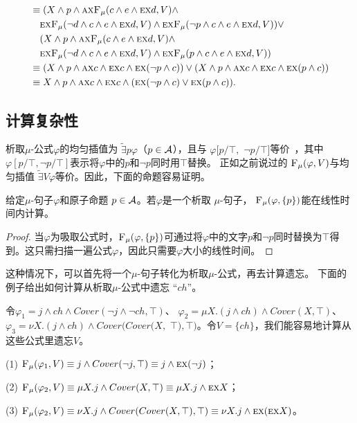 \begin{example}
\begin{align*}
		& \equiv (X \wedge p \wedge \textsc{a}\textsc{x}{\textsc{F}_{\textsc{$\mu$}}}(c \wedge e \wedge \textsc{e}\textsc{x} d, V) \wedge\\
		& \quad\textsc{e}\textsc{x}{\textsc{F}_{\textsc{$\mu$}}}(\neg d \wedge c \wedge e \wedge \textsc{e}\textsc{x} d, V) \wedge  \textsc{e}\textsc{x}{\textsc{F}_{\textsc{$\mu$}}}(\neg p \wedge c \wedge e \wedge \textsc{e}\textsc{x} d, V) )\vee \\
		& \quad (X \wedge p \wedge \textsc{a}\textsc{x}{\textsc{F}_{\textsc{$\mu$}}}(c \wedge e \wedge \textsc{e}\textsc{x} d, V) \wedge\\
		& \quad\textsc{e}\textsc{x}{\textsc{F}_{\textsc{$\mu$}}}(\neg d \wedge c \wedge e \wedge \textsc{e}\textsc{x} d, V) \wedge  \textsc{e}\textsc{x}{\textsc{F}_{\textsc{$\mu$}}}( p \wedge c \wedge e \wedge \textsc{e}\textsc{x} d, V)) \\
		& \equiv (X \wedge p \wedge \textsc{a}\textsc{x} c \wedge \textsc{e}\textsc{x} c \wedge \textsc{e}\textsc{x} (\neg p \wedge c)) \vee 
		(X \wedge p \wedge \textsc{a}\textsc{x} c \wedge \textsc{e}\textsc{x} c \wedge \textsc{e}\textsc{x} (p \wedge c)) \\
		& \equiv X \wedge p \wedge \textsc{a}\textsc{x} c \wedge \textsc{e}\textsc{x} c \wedge (\textsc{e}\textsc{x} (\neg p \wedge c) \vee \textsc{e}\textsc{x} (p \wedge c)).
	\end{align*}
\end{example}

\subsection{计算复杂性}
析取$\mu$-公式$\varphi$的均匀插值为 $\widetilde{\exists}p \varphi$（$p\in {\cal A}$），且与 $\varphi[p/\top,$ $\neg p/\top]$等价~\cite{d2006modal}，其中$\varphi[p/\top,\neg p/\top]$表示将$\varphi$中的$p$和$\neg p$同时用$\top$替换。
正如之前说过的 ${\textsc{F}_{\textsc{$\mu$}}}(\varphi, V)$与均匀插值 $\widetilde{\exists}V \varphi$等价\cite{d2006modal}。因此，下面的命题容易证明。
\begin{corollary}\label{pro:disLiT}
	给定$\mu$-句子$\varphi$和原子命题 $p\in {\cal A}$。若$\varphi$是一个析取 $\mu$-句子， ${\textsc{F}_{\textsc{$\mu$}}}(\varphi, \{p\})$能在线性时间内计算。
\end{corollary}
\begin{proof}
	当$\varphi$为吸取公式时，${\textsc{F}_{\textsc{$\mu$}}}(\varphi, \{p\})$可通过将$\varphi$中的文字$p$和$\neg p$同时替换为$\top$得到。这只需扫描一遍公式$\varphi$，因此只需要$\varphi$大小的线性时间。
\end{proof}

这种情况下，可以首先将一个$\mu$-句子转化为析取$\mu$-公式，再去计算遗忘。
下面的例子给出如何计算从析取$\mu$-公式中遗忘 “$ch$”。
\begin{example}
	令$\varphi_1=  j \wedge ch \wedge Cover(\neg j \wedge \neg ch, \top)$、 $\varphi_2= \mu X. (j \wedge ch) \wedge Cover(X, \top)$、 $\varphi_3=  \nu X. (j \wedge ch) \wedge Cover(Cover(X,$ $\top), \top)$。令$V=\{ch\}$，我们能容易地计算从这些公式里遗忘$V$。
	
	(1) ${\textsc{F}_{\textsc{$\mu$}}}(\varphi_1, V) \equiv j \wedge Cover(\neg j, \top) \equiv j \wedge \textsc{e} \textsc{x}(\neg j)$；
	
	(2) ${\textsc{F}_{\textsc{$\mu$}}}(\varphi_2, V) \equiv \mu X. j  \wedge Cover(X, \top) \equiv \mu X. j \wedge \textsc{e} \textsc{x} X$；
	
	(3) ${\textsc{F}_{\textsc{$\mu$}}}(\varphi_2, V) \equiv \nu X. j \wedge Cover(Cover(X, \top), \top) \equiv \nu X. j \wedge \textsc{e} \textsc{x}(\textsc{e} \textsc{x} X)$。
\end{example}

